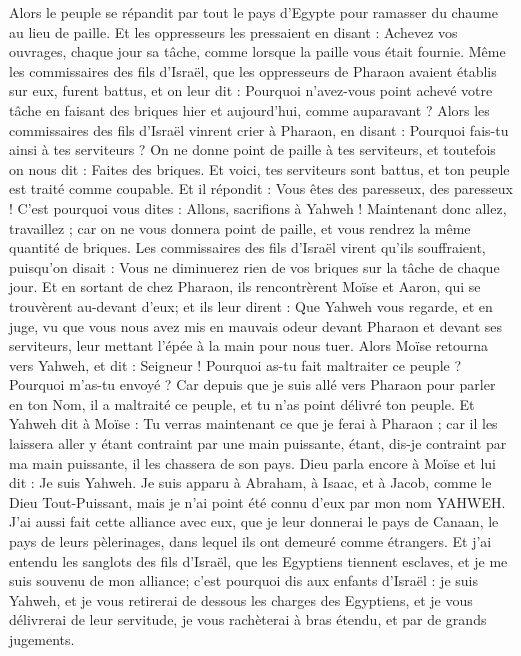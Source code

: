 \begin{multicols}{2}
Alors le peuple se répandit par tout le pays d'Egypte pour ramasser du chaume au lieu de paille.
Et les oppresseurs les pressaient en disant : Achevez vos ouvrages, chaque jour sa tâche, comme lorsque la paille vous était fournie.
Même les commissaires des fils d'Israël, que les oppresseurs de Pharaon avaient établis sur eux, furent battus, et on leur dit : Pourquoi n'avez-vous point achevé votre tâche en faisant des briques hier et aujourd'hui, comme auparavant ?
Alors les commissaires des fils d'Israël vinrent crier à Pharaon, en disant : Pourquoi fais-tu ainsi à tes serviteurs ?
On ne donne point de paille à tes serviteurs, et toutefois on nous dit : Faites des briques. Et voici, tes serviteurs sont battus, et ton peuple est traité comme coupable.
Et il répondit : Vous êtes des paresseux, des paresseux ! C'est pourquoi vous dites : Allons, sacrifions à Yahweh !
Maintenant donc allez, travaillez ; car on ne vous donnera point de paille, et vous rendrez la même quantité de briques.
Les commissaires des fils d'Israël virent qu'ils souffraient, puisqu'on disait : Vous ne diminuerez rien de vos briques sur la tâche de chaque jour.
Et en sortant de chez Pharaon, ils rencontrèrent Moïse et Aaron, qui  se trouvèrent au-devant d'eux;
et ils leur dirent : Que Yahweh vous regarde, et en juge, vu que vous nous avez mis en mauvais odeur devant Pharaon et devant ses serviteurs, leur mettant l'épée à la main pour nous tuer.
Alors Moïse retourna vers Yahweh, et dit : Seigneur ! Pourquoi as-tu fait maltraiter ce peuple ? Pourquoi m'as-tu envoyé ?
Car depuis que je suis allé vers Pharaon pour parler en ton Nom, il a maltraité ce peuple, et tu n'as point délivré ton peuple.
\VerseOne{}Et Yahweh dit à Moïse : Tu verras maintenant ce que je ferai à Pharaon ; car il les laissera aller y étant contraint par une main puissante, étant, dis-je contraint par ma main puissante, il les chassera de son pays.
Dieu parla encore à Moïse et lui dit : Je suis Yahweh.
Je suis apparu à Abraham, à Isaac, et à Jacob, comme le Dieu Tout-Puissant, mais je n'ai point été connu d'eux par mon nom YAHWEH.
J'ai aussi fait cette alliance avec eux, que je leur donnerai le pays de Canaan, le pays de leurs pèlerinages, dans lequel ils ont demeuré comme étrangers.
Et j'ai entendu les sanglots des fils d'Israël, que les Egyptiens tiennent esclaves, et je me suis souvenu de mon alliance;
c’est pourquoi dis aux enfants d’Israël : je suis Yahweh, et je vous retirerai de dessous les charges des Egyptiens, et je vous délivrerai de leur servitude, je vous rachèterai à bras étendu, et par de grands jugements.

\end{multicols}
